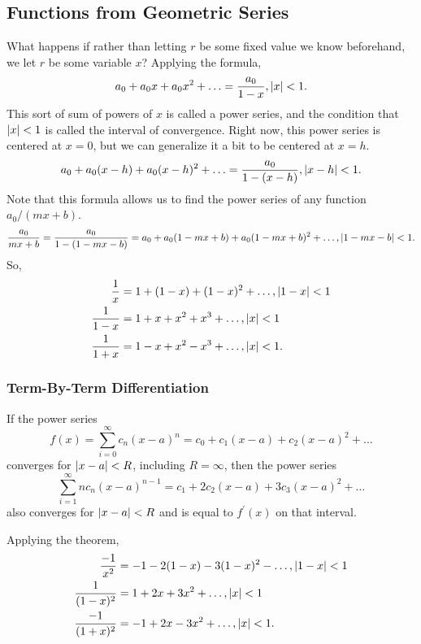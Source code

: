 \subsection{Functions from Geometric Series}
What happens if rather than letting $r$ be some fixed value we know beforehand, we let $r$ be some variable $x$?
Applying the formula,
\begin{equation*}
	a_0 + a_0x + a_0x^2 + \ldots = \frac{a_0}{1-x}, \lvert x \rvert < 1.
\end{equation*}
This sort of sum of powers of $x$ is called a power series, and the condition that $\lvert x \rvert<1$ is called the interval of convergence.
Right now, this power series is centered at $x=0$, but we can generalize it a bit to be centered at $x=h$.
\begin{equation*}
	a_0 + a_0(x-h) + a_0(x-h)^2 + \ldots = \frac{a_0}{1-(x-h)}, \lvert x-h \rvert < 1.
\end{equation*}
Note that this formula allows us to find the power series of any function $a_0/(mx+b)$.
\begin{equation*}
	\frac{a_0}{mx + b} = \frac{a_0}{1-(1-mx-b)} = a_0 + a_0(1-mx+b) + a_0(1-mx+b)^2 + \ldots, \lvert 1-mx-b \rvert < 1.
\end{equation*}
So,
\begin{align*}
	\frac{1}{x} &= 1 + (1-x) + (1-x)^2 + \ldots, \lvert 1-x \rvert < 1 \\
	\frac{1}{1-x} &= 1 + x + x^2 + x^3 + \ldots, \lvert x \rvert < 1 \\
	\frac{1}{1+x} &= 1 - x + x^2 - x^3 + \ldots, \lvert x \rvert < 1.
\end{align*}

\subsubsection{Term-By-Term Differentiation}
\begin{theorem}
	If the power series
	\begin{equation*}
		f(x) = \sum_{i=0}^{\infty}{c_n(x-a)^n} = c_0 + c_1(x-a) + c_2(x-a)^2 + \ldots
	\end{equation*}
	converges for $\lvert x-a \rvert < R$, including $R=\infty$, then the power series
	\begin{equation*}
		\sum_{i=1}^{\infty}{nc_n(x-a)^{n-1}} = c_1 + 2c_2(x-a) + 3c_3(x-a)^2 + \ldots
	\end{equation*}
	also converges for $\lvert x-a \rvert < R$ and is equal to $f^\prime(x)$ on that interval.
\end{theorem}
\noindent
Applying the theorem,
\begin{align*}
	\frac{-1}{x^2} &= -1 - 2(1-x) - 3(1-x)^2 - \ldots, \lvert 1-x \rvert < 1 \\
	\frac{1}{(1-x)^2} &= 1 + 2x + 3x^2 + \ldots, \lvert x \rvert < 1 \\
	\frac{-1}{(1+x)^2} &= -1 + 2x - 3x^2 + \ldots, \lvert x \rvert < 1.
\end{align*}

